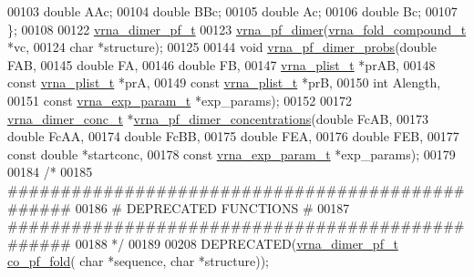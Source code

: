 \begin{DoxyCode}
00103   \textcolor{keywordtype}{double} AAc;
00104   \textcolor{keywordtype}{double} BBc;
00105   \textcolor{keywordtype}{double} Ac;
00106   \textcolor{keywordtype}{double} Bc;
00107 \};
00108 
00122 \hyperlink{group__pf__cofold_structvrna__dimer__pf__s}{vrna\_dimer\_pf\_t}
00123 \hyperlink{group__pf__cofold_ga4e5c7d06c302a7c59fc0d64dc142ca63}{vrna\_pf\_dimer}(\hyperlink{group__fold__compound_structvrna__fc__s}{vrna\_fold\_compound\_t} *vc,
00124               \textcolor{keywordtype}{char} *structure);
00125 
00144 \textcolor{keywordtype}{void}  \hyperlink{group__pf__cofold_gaf04708a63d2385d5959db9f886741479}{vrna\_pf\_dimer\_probs}(\textcolor{keywordtype}{double} FAB,
00145                           \textcolor{keywordtype}{double} FA,
00146                           \textcolor{keywordtype}{double} FB,
00147                           \hyperlink{group__data__structures_structvrna__plist__s}{vrna\_plist\_t} *prAB,
00148                           \textcolor{keyword}{const} \hyperlink{group__data__structures_structvrna__plist__s}{vrna\_plist\_t} *prA,
00149                           \textcolor{keyword}{const} \hyperlink{group__data__structures_structvrna__plist__s}{vrna\_plist\_t} *prB,
00150                           \textcolor{keywordtype}{int} Alength,
00151                           \textcolor{keyword}{const} \hyperlink{group__energy__parameters_structvrna__exp__param__s}{vrna\_exp\_param\_t} *exp\_params);
00152 
00172 \hyperlink{group__pf__cofold_structvrna__dimer__conc__s}{vrna\_dimer\_conc\_t} *\hyperlink{group__pf__cofold_ga83b8d5d0f7875d6d5013b208f23e3356}{vrna\_pf\_dimer\_concentrations}(\textcolor{keywordtype}{double} FcAB,
00173                                       \textcolor{keywordtype}{double} FcAA,
00174                                       \textcolor{keywordtype}{double} FcBB,
00175                                       \textcolor{keywordtype}{double} FEA,
00176                                       \textcolor{keywordtype}{double} FEB,
00177                                       \textcolor{keyword}{const} \textcolor{keywordtype}{double} *startconc,
00178                                       \textcolor{keyword}{const} \hyperlink{group__energy__parameters_structvrna__exp__param__s}{vrna\_exp\_param\_t} *exp\_params);
00179 
00184 \textcolor{comment}{/*}
00185 \textcolor{comment}{#################################################}
00186 \textcolor{comment}{# DEPRECATED FUNCTIONS                          #}
00187 \textcolor{comment}{#################################################}
00188 \textcolor{comment}{*/}
00189 
00208 DEPRECATED(\hyperlink{group__pf__cofold_structvrna__dimer__pf__s}{vrna\_dimer\_pf\_t} \hyperlink{part__func__co_8h_ae5c1e7331718669bdae7a86de2be6184}{co\_pf\_fold}( \textcolor{keywordtype}{char} *sequence, \textcolor{keywordtype}{char} *structure));

\end{DoxyCode}
